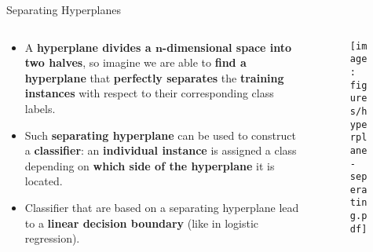 \documentclass[document.tex]{subfiles}
\begin{document}
    \begin{frame}{Separating Hyperplanes}
        \begin{columns}
            \begin{column}{0.6\textwidth}
                \begin{itemize}
                    \item A \textbf{hyperplane divides a $\boldsymbol{n}$-dimensional space into two halves}, so imagine we are able to \textbf{find a hyperplane} that \textbf{perfectly separates} the \textbf{training instances} with respect to their corresponding class labels.
                    \item Such \textbf{separating hyperplane} can be used to construct a \textbf{classifier}: an \textbf{individual instance} is assigned a class depending on \textbf{which side of the hyperplane} it is located.
                    \item Classifier that are based on a separating hyperplane lead to a \textbf{linear decision boundary} (like in logistic regression).
                \end{itemize}
            \end{column}
            \begin{column}{0.4\textwidth}
                \begin{figure}
                    \label{fig:separating-hyperplane}
                    \texttt{[image: figures/hyperplane-seperating.pdf]}
                \end{figure}
            \end{column}
        \end{columns}
    \end{frame}
\end{document}

